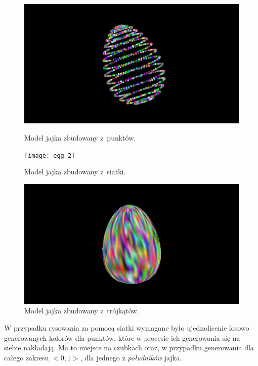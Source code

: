 \begin{figure}[H]
    \
    \begin{minipage}[t]{.45\linewidth}
        \includegraphics[width=\linewidth, trim={8cm 0 8cm 0},clip]{img/egg_1.png}
        \caption{Model jajka zbudowany z~punktów.}
    \end{minipage}
    \hspace{.05\linewidth}
    \begin{minipage}[t]{0.45\linewidth}
        \texttt{[image: egg\_2]}
        \caption{Model jajka zbudowany z~siatki.}
    \end{minipage}
\end{figure}
\begin{figure}[h]
    \centering
    \includegraphics[width=0.45\linewidth, trim={8cm 0 8cm 0},clip]{img/egg_3.png}
    \caption{Model jajka zbudowany z~trójkątów.}
\end{figure}
\newpage
W przypadku rysowania za pomocą siatki wymagane było ujednolicenie losowo generowanych kolorów dla punktów, które w procesie ich generowania się na siebie nakładają. Ma to miejsce na czubkach oraz, w przypadku generowania dla całego zakresu $<0;1>$, dla jednego z \textit{południków} jajka.

